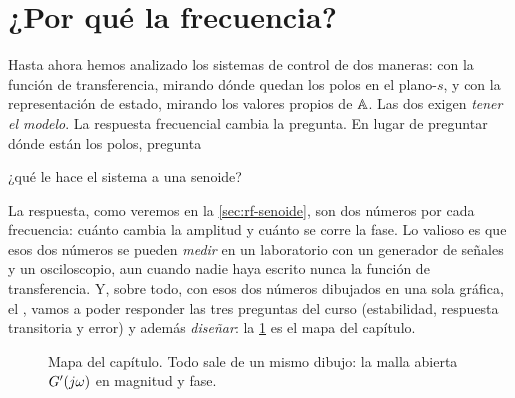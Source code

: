\section{¿Por qué la frecuencia?}
\label{sec:rf-porque}

Hasta ahora hemos analizado los sistemas de control de dos maneras: con la función de transferencia, mirando dónde quedan los polos en el plano-$s$, y con la representación de estado, mirando los valores propios de $\mathbb{A}$. Las dos exigen \emph{tener el modelo}. La respuesta frecuencial cambia la pregunta. En lugar de preguntar dónde están los polos, pregunta
\begin{center}
\sffamily\large\color{ctrlazul}¿qué le hace el sistema a una senoide?
\end{center}
La respuesta, como veremos en la \cref{sec:rf-senoide}, son dos números por cada frecuencia: cuánto cambia la amplitud y cuánto se corre la fase. Lo valioso es que esos dos números se pueden \emph{medir} en un laboratorio con un generador de señales y un osciloscopio, aun cuando nadie haya escrito nunca la función de transferencia. Y, sobre todo, con esos dos números dibujados en una sola gráfica, el , vamos a poder responder las tres preguntas del curso (estabilidad, respuesta transitoria y error) y además \emph{diseñar}: la \cref{fig:rf-mapa} es el mapa del capítulo.

\begin{figure}[ht]
\centering
{}
\caption{Mapa del capítulo. Todo sale de un mismo dibujo: la malla abierta $G'(j\omega)$ en magnitud y fase.}
\label{fig:rf-mapa}
\end{figure}

